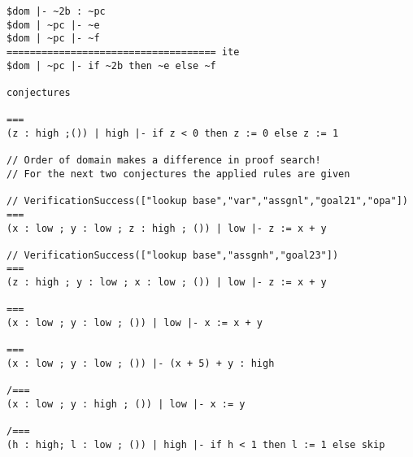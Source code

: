 \begin{lstlisting}[language=sltc]
$dom |- ~2b : ~pc
$dom | ~pc |- ~e
$dom | ~pc |- ~f
==================================== ite
$dom | ~pc |- if ~2b then ~e else ~f

conjectures

===
(z : high ;()) | high |- if z < 0 then z := 0 else z := 1

// Order of domain makes a difference in proof search!
// For the next two conjectures the applied rules are given

// VerificationSuccess(["lookup base","var","assgnl","goal21","opa"])
===
(x : low ; y : low ; z : high ; ()) | low |- z := x + y

// VerificationSuccess(["lookup base","assgnh","goal23"])
===
(z : high ; y : low ; x : low ; ()) | low |- z := x + y

===
(x : low ; y : low ; ()) | low |- x := x + y

===
(x : low ; y : low ; ()) |- (x + 5) + y : high

/===
(x : low ; y : high ; ()) | low |- x := y

/===
(h : high; l : low ; ()) | high |- if h < 1 then l := 1 else skip
\end{lstlisting}

